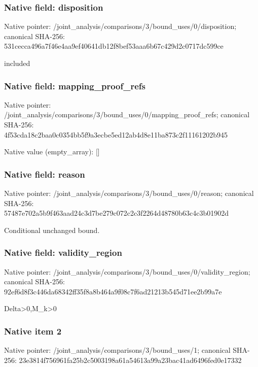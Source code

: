 \documentclass[10pt,a4paper]{article}
\begin{document}
\subsubsection{Native field: disposition}
Native pointer: /joint\_\allowbreak{}analysis/comparisons/3/bound\_\allowbreak{}uses/0/disposition; canonical SHA-256: 531cecca496a7f46e4aa9ef40641db12f8bef53aaa6b67c429d2c0717dc599ce

\begingroup\raggedright\sloppy included\par\endgroup

\subsubsection{Native field: mapping\_\allowbreak{}proof\_\allowbreak{}refs}
Native pointer: /joint\_\allowbreak{}analysis/comparisons/3/bound\_\allowbreak{}uses/0/mapping\_\allowbreak{}proof\_\allowbreak{}refs; canonical SHA-256: 4f53cda18c2baa0c0354bb5f9a3ecbe5ed12ab4d8e11ba873c2f11161202b945

Native value (empty\_\allowbreak{}array): []

\subsubsection{Native field: reason}
Native pointer: /joint\_\allowbreak{}analysis/comparisons/3/bound\_\allowbreak{}uses/0/reason; canonical SHA-256: 57487e702a5b9f463aad24c3d7be279c072c2c3f2264d48780b63c4c3b01902d

\begingroup\raggedright\sloppy Conditional unchanged bound.\par\endgroup

\subsubsection{Native field: validity\_\allowbreak{}region}
Native pointer: /joint\_\allowbreak{}analysis/comparisons/3/bound\_\allowbreak{}uses/0/validity\_\allowbreak{}region; canonical SHA-256: 92ef6d8f3c446da68342ff35f8a8b464a9f08c7f6ad21213b545d71ee2b99a7e

\begingroup\raggedright\sloppy Delta>0,\allowbreak{}M\_\allowbreak{}k>0\par\endgroup

\subsubsection{Native item 2}
Native pointer: /joint\_\allowbreak{}analysis/comparisons/3/bound\_\allowbreak{}uses/1; canonical SHA-256: 23e3814f756961fa25b2c5003198a61a54613a99a23bac41ad6496fed0e17332
\end{document}
